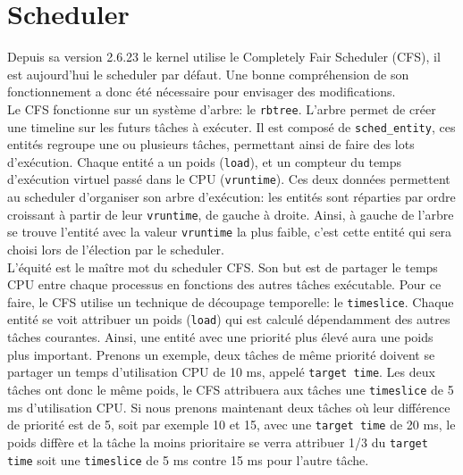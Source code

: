 \section*{Scheduler}

Depuis sa version 2.6.23 le kernel utilise le Completely Fair Scheduler (CFS),
il est aujourd'hui le scheduler par défaut. Une bonne compréhension de son
fonctionnement a donc été nécessaire pour envisager des modifications.
\\

Le CFS fonctionne sur un système d'arbre: le \verb|rbtree|. L'arbre permet de
créer une timeline sur les futurs tâches à exécuter.
Il est composé de \verb|sched_entity|, ces entités regroupe une ou plusieurs
tâches, permettant ainsi de faire des lots d'exécution. Chaque entité a un
poids (\verb|load|), et un compteur du temps d'exécution virtuel passé dans le
CPU (\verb|vruntime|). Ces deux données permettent au scheduler d'organiser son
arbre d'exécution: les entités sont réparties par ordre croissant à partir de
leur \verb|vruntime|, de gauche à droite. Ainsi, à gauche de l'arbre se trouve
l'entité avec la valeur \verb|vruntime| la plus faible, c'est cette entité qui
sera choisi lors de l'élection par le scheduler.
\\

L'équité est le maître mot du scheduler CFS. Son but est de partager le temps 
CPU entre chaque processus en fonctions des autres tâches exécutable. Pour ce 
faire, le CFS utilise un technique de découpage temporelle: le \verb|timeslice|.
 Chaque entité se voit attribuer un poids (\verb|load|) qui est calculé 
 dépendamment des autres tâches courantes. Ainsi, une entité avec une priorité 
 plus élevé aura une poids plus important. Prenons un exemple, deux tâches de 
 même priorité doivent se partager un temps d'utilisation CPU de 10 ms, appelé 
 \verb|target time|. Les deux tâches ont donc le même poids, le CFS attribuera 
 aux tâches une \verb|timeslice| de 5 ms d'utilisation CPU. Si nous prenons 
 maintenant deux tâches où leur différence de priorité est de 5, soit par 
 exemple 10 et 15, avec une \verb|target time| de 20 ms, le poids diffère et la 
 tâche la moins prioritaire se verra attribuer 1/3 du \verb|target time| soit 
 une \verb|timeslice| de 5 ms contre 15 ms pour l'autre tâche.

\\

